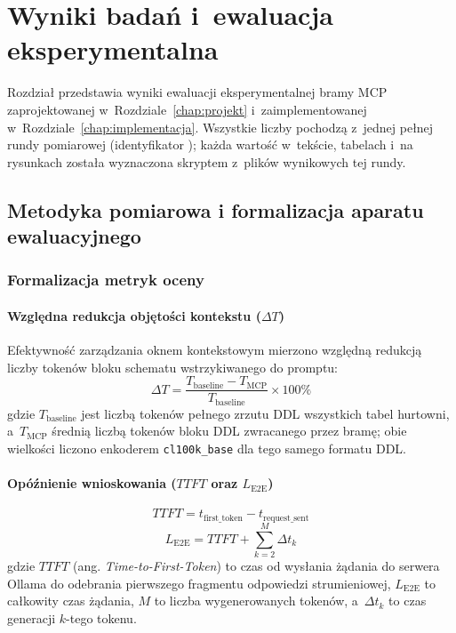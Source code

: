 \chapter{Wyniki badań i~ewaluacja eksperymentalna}
\label{chap:wyniki}

Rozdział przedstawia wyniki ewaluacji eksperymentalnej bramy MCP~\cite{mcp_spec} zaprojektowanej w~Rozdziale~\ref{chap:projekt} i~zaimplementowanej w~Rozdziale~\ref{chap:implementacja}. Wszystkie liczby pochodzą z~jednej pełnej rundy pomiarowej (identyfikator \texttt{\wynRunId}); każda wartość w~tekście, tabelach i~na rysunkach została wyznaczona skryptem z~plików wynikowych tej rundy.


\section{Metodyka pomiarowa i formalizacja aparatu ewaluacyjnego}
\label{sec:wyniki_metodyka}

\subsection{Formalizacja metryk oceny}
\label{subsec:wyniki_metryki_formalne}

\subsubsection{Względna redukcja objętości kontekstu ($\Delta T$)}
Efektywność zarządzania oknem kontekstowym mierzono względną redukcją liczby tokenów bloku schematu wstrzykiwanego do promptu:
\begin{equation}
\Delta T = \frac{T_{\text{baseline}} - T_{\text{MCP}}}{T_{\text{baseline}}} \times 100\%
\label{eq:delta_tokens_formal}
\end{equation}
gdzie $T_{\text{baseline}}$ jest liczbą tokenów pełnego zrzutu DDL wszystkich tabel hurtowni, a~$T_{\text{MCP}}$ średnią liczbą tokenów bloku DDL zwracanego przez bramę; obie wielkości liczono enkoderem \texttt{cl100k\_base} dla tego samego formatu DDL.

\subsubsection{Opóźnienie wnioskowania ($TTFT$ oraz $L_{\text{E2E}}$)}
\begin{equation}
TTFT = t_{\text{first\_token}} - t_{\text{request\_sent}}
\label{eq:ttft_def}
\end{equation}
\begin{equation}
L_{\text{E2E}} = TTFT + \sum_{k=2}^{M} \Delta t_k
\label{eq:le2e_def}
\end{equation}
gdzie $TTFT$ (ang. \emph{Time-to-First-Token}) to czas od wysłania żądania do serwera Ollama do odebrania pierwszego fragmentu odpowiedzi strumieniowej, $L_{\text{E2E}}$ to całkowity czas żądania, $M$ to liczba wygenerowanych tokenów, a~$\Delta t_k$ to czas generacji $k$-tego tokenu.

